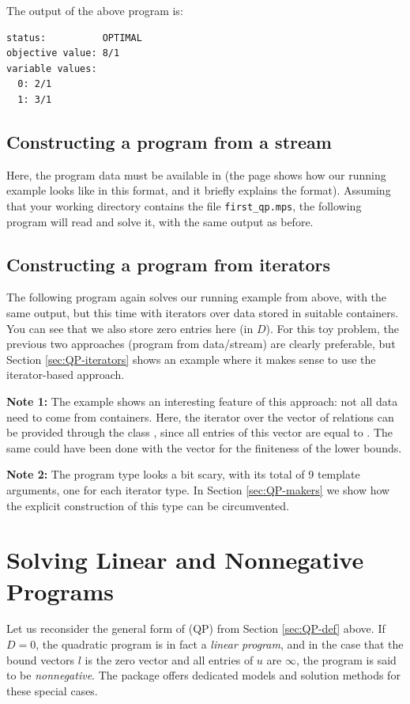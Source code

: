 
The output of the above program is:
\begin{verbatim}
status:          OPTIMAL
objective value: 8/1
variable values:
  0: 2/1
  1: 3/1
\end{verbatim}

\subsection{Constructing a program from a stream}
Here, the program data must be available in  (the
 page shows how our running example looks like in
this format, and it briefly explains the format). Assuming that
your working directory contains the file \texttt{first\_qp.mps},
the following program will read and solve it, with the same output
as before.


\subsection{Constructing a program from iterators}
The following program again solves our running example from above,
with the same output, but this time with iterators over data stored 
in suitable containers. You can see that we also store zero 
entries here (in $D$). For this toy problem, the previous two
approaches (program from data/stream) are clearly preferable, 
but Section \ref{sec:QP-iterators} shows an
example where it makes sense to use the iterator-based approach.


{\bf Note 1:} The example shows an interesting feature of this approach:
not all data need to come from containers. Here, the iterator over the
vector of relations can be provided through the class
, since all entries of this vector
are equal to . The same could have been done with
the vector  for the finiteness of the lower bounds. 

{\bf Note 2:} The program type looks a bit scary, with its total of
9 template arguments, one for each iterator type. In Section
\ref{sec:QP-makers} we show how the explicit construction of
this type can be circumvented.

\section{Solving Linear and Nonnegative Programs\label{sec:QP-lp}}
Let us reconsider the general form of (QP) from Section \ref{sec:QP-def} 
above. If $D=0$, the quadratic program is in fact a \emph{linear program},
and in the case that the bound vectors $l$ is the zero vector and all 
entries of $u$ are $\infty$, the program is said to be \emph{nonnegative}. 
The package offers dedicated models and solution methods for these special
cases.

